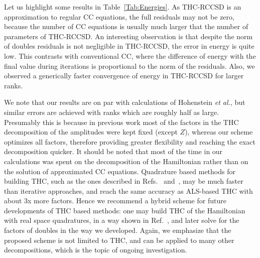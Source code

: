 %
{\color{blue} Let us highlight some results in Table~\ref{Tab:Energies}.
As THC-RCCSD is an approximation to regular CC equations,
the full residuals may not be zero, because the number of CC equations is 
usually much larger that the number of parameters of THC-RCCSD. 
An interesting observation is that despite the norm of 
doubles residuals is not negligible in THC-RCCSD, the error in energy 
is quite low. This contrasts with conventional CC, where the 
difference of energy with the final value during iterations 
is proportional to the norm of the residuals. Also, we observed
a generically faster convergence of energy in THC-RCCSD for larger ranks.
}

We note that our results are on par with calculations of
Hohenstein \emph{et al.},\cite{hohenstein_thc3} but similar errors are achieved 
with
ranks which are roughly half as large.  Presumably this is because in
previous work most of the factors in the THC decomposition of the
amplitudes were kept fixed (except $Z$), whereas our scheme optimizes
all factors, therefore providing greater flexibility and reaching the
exact decomposition quicker. 
{\color{blue} It should be noted that most of the time in our 
calculations was spent on the decomposition of the Hamiltonian rather
than on the solution of approximated CC equations. 
Quadrature based methods for building THC, such as the ones described in
Refs.~\cite{hohenstein_thc1} and~\cite{parrish2013discrete}, may be much
faster than iterative approaches, and reach the same accuracy as ALS-based 
THC with about 3x more factors.\cite{parrish2013discrete}
Hence we recommend a hybrid scheme for future developments of THC based methods:
one may build THC of the Hamiltonian with real space quadratures, in a way shown
in Ref.~\cite{hohenstein_thc2}, and later solve for the factors of doubles in 
the 
way we developed}. Again, we emphasize that the proposed
scheme is not limited to THC, and can be applied to many other
decompositions, which is the topic of ongoing investigation.

